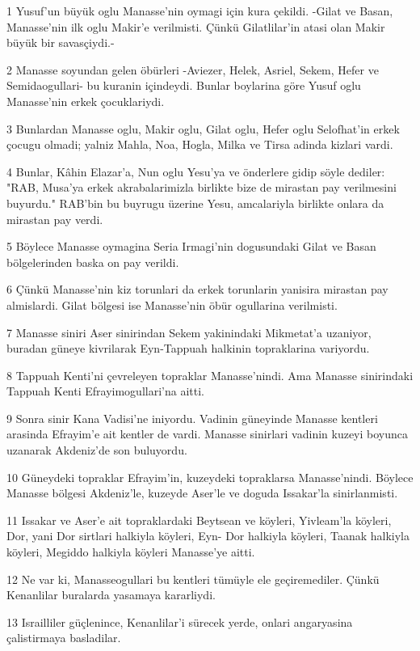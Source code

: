 \par 1 Yusuf'un büyük oglu Manasse'nin oymagi için kura çekildi. -Gilat ve Basan, Manasse'nin ilk oglu Makir'e verilmisti. Çünkü Gilatlilar'in atasi olan Makir büyük bir savasçiydi.-
\par 2 Manasse soyundan gelen öbürleri -Aviezer, Helek, Asriel, Sekem, Hefer ve Semidaogullari- bu kuranin içindeydi. Bunlar boylarina göre Yusuf oglu Manasse'nin erkek çocuklariydi.
\par 3 Bunlardan Manasse oglu, Makir oglu, Gilat oglu, Hefer oglu Selofhat'in erkek çocugu olmadi; yalniz Mahla, Noa, Hogla, Milka ve Tirsa adinda kizlari vardi.
\par 4 Bunlar, Kâhin Elazar'a, Nun oglu Yesu'ya ve önderlere gidip söyle dediler: "RAB, Musa'ya erkek akrabalarimizla birlikte bize de mirastan pay verilmesini buyurdu." RAB'bin bu buyrugu üzerine Yesu, amcalariyla birlikte onlara da mirastan pay verdi.
\par 5 Böylece Manasse oymagina Seria Irmagi'nin dogusundaki Gilat ve Basan bölgelerinden baska on pay verildi.
\par 6 Çünkü Manasse'nin kiz torunlari da erkek torunlarin yanisira mirastan pay almislardi. Gilat bölgesi ise Manasse'nin öbür ogullarina verilmisti.
\par 7 Manasse siniri Aser sinirindan Sekem yakinindaki Mikmetat'a uzaniyor, buradan güneye kivrilarak Eyn-Tappuah halkinin topraklarina variyordu.
\par 8 Tappuah Kenti'ni çevreleyen topraklar Manasse'nindi. Ama Manasse sinirindaki Tappuah Kenti Efrayimogullari'na aitti.
\par 9 Sonra sinir Kana Vadisi'ne iniyordu. Vadinin güneyinde Manasse kentleri arasinda Efrayim'e ait kentler de vardi. Manasse sinirlari vadinin kuzeyi boyunca uzanarak Akdeniz'de son buluyordu.
\par 10 Güneydeki topraklar Efrayim'in, kuzeydeki topraklarsa Manasse'nindi. Böylece Manasse bölgesi Akdeniz'le, kuzeyde Aser'le ve doguda Issakar'la sinirlanmisti.
\par 11 Issakar ve Aser'e ait topraklardaki Beytsean ve köyleri, Yivleam'la köyleri, Dor, yani Dor sirtlari halkiyla köyleri, Eyn- Dor halkiyla köyleri, Taanak halkiyla köyleri, Megiddo halkiyla köyleri Manasse'ye aitti.
\par 12 Ne var ki, Manasseogullari bu kentleri tümüyle ele geçiremediler. Çünkü Kenanlilar buralarda yasamaya kararliydi.
\par 13 Israilliler güçlenince, Kenanlilar'i sürecek yerde, onlari angaryasina çalistirmaya basladilar.
